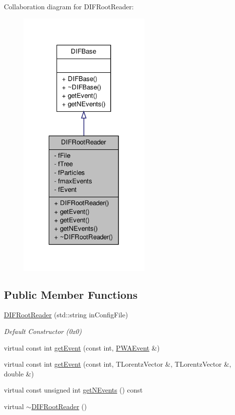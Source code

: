 Collaboration diagram for DIFRootReader:\nopagebreak
\begin{figure}[H]
\begin{center}
\leavevmode
\includegraphics[width=186pt]{d2/d6b/classDIFRootReader__coll__graph}
\end{center}
\end{figure}
\subsection*{Public Member Functions}
\begin{DoxyCompactItemize}
\item 
\hyperlink{classDIFRootReader_a2780d5277825eb0d3b3ced2c2db05ee4}{DIFRootReader} (std::string inConfigFile)
\begin{DoxyCompactList}\small\item\em Default Constructor (0x0) \end{DoxyCompactList}\item 
virtual const int \hyperlink{classDIFRootReader_a2469dc5451328c7e802f2ff540842082}{getEvent} (const int, \hyperlink{classPWAEvent}{PWAEvent} \&)
\item 
virtual const int \hyperlink{classDIFRootReader_a4d39cf2617a549c0fd6b097be8890756}{getEvent} (const int, TLorentzVector \&, TLorentzVector \&, double \&)
\item 
virtual const unsigned int \hyperlink{classDIFRootReader_a2cee7a677795a26ecef7cdf3129162ab}{getNEvents} () const 
\item 
virtual \hyperlink{classDIFRootReader_a3b2d897442630d757da57a3f2a83f7f3}{$\sim$DIFRootReader} ()
\end{DoxyCompactItemize}
